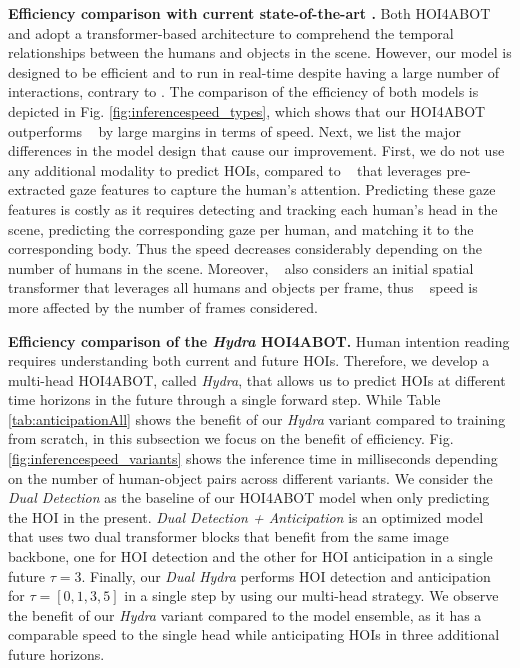 \documentclass{article}
\begin{document}
\textbf{Efficiency comparison with current state-of-the-art \cite{NI2023103741}.} Both HOI4ABOT and \cite{NI2023103741} adopt a transformer-based architecture to comprehend the temporal relationships between the humans and objects in the scene. However, our model is designed to be efficient and to run in real-time despite having a large number of interactions, contrary to \cite{NI2023103741}. The comparison of the efficiency of both models is depicted in Fig. \ref{fig:inferencespeed_types}, which shows that our HOI4ABOT outperforms ~\citep{NI2023103741} by large margins in terms of speed. Next, we list the major differences in the model design that cause our improvement. First, we do not use any additional modality to predict HOIs, compared to ~\citep{NI2023103741} that leverages pre-extracted gaze features to capture the human's attention. Predicting these gaze features is costly as it requires detecting and tracking each human's head in the scene, predicting the corresponding gaze per human, and matching it to the corresponding body. Thus the speed decreases considerably depending on the number of humans in the scene. Moreover, ~\citep{NI2023103741} also considers an initial spatial transformer that leverages all humans and objects per frame, thus ~\citep{NI2023103741} speed is more affected by the number of frames considered.

\textbf{Efficiency comparison of the \textit{Hydra} HOI4ABOT.} Human intention reading requires understanding both current and future HOIs. Therefore, we develop a multi-head HOI4ABOT, called \textit{Hydra}, that allows us to predict HOIs at different time horizons in the future through a single forward step. While Table \ref{tab:anticipationAll} shows the benefit of our \textit{Hydra} variant compared to training from scratch, in this subsection we focus on the benefit of efficiency. Fig. \ref{fig:inferencespeed_variants} shows the inference time in milliseconds depending on the number of human-object pairs across different variants. We consider the \textit{Dual Detection} as the baseline of our HOI4ABOT model when only predicting the HOI in the present. \textit{Dual Detection + Anticipation} is an optimized model that uses two dual transformer blocks that benefit from the same image backbone, one for HOI detection and the other for HOI anticipation in a single future $\tau=3$. Finally, our \textit{Dual Hydra} performs HOI detection and anticipation for $\tau=[0,1,3,5]$ in a single step by using our multi-head strategy. We observe the benefit of our \textit{Hydra} variant compared to the model ensemble, as it has a comparable speed to the single head while anticipating HOIs in three additional future horizons.
\end{document}
